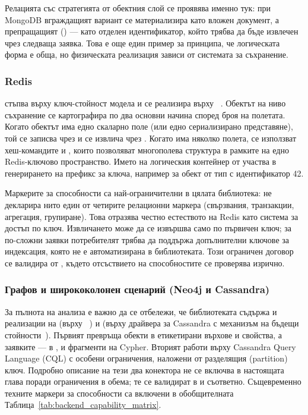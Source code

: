 Релацията със стратегията  от обектния слой се проявява именно тук: при MongoDB вграждащият вариант се материализира като вложен документ, а препращащият () --- като отделен идентификатор, който трябва да бъде извлечен чрез следваща заявка. Това е още един пример за принципа, че логическата форма е обща, но физическата реализация зависи от системата за съхранение.

\subsubsection{Redis}

 стъпва върху ключ-стойност модела и се реализира върху ~\cite{hiredis}. Обектът на ниво съхранение се картографира по два основни начина според броя на полетата. Когато обектът има едно скаларно поле (или едно сериализирано представяне), той се записва чрез  и се извлича чрез . Когато има няколко полета, се използват хеш-командите  и , които позволяват многополева структура в рамките на едно Redis-ключово пространство. Името на логическия контейнер от  участва в генерирането на префикс за ключа, например  за обект от тип  с идентификатор 42.

Маркерите за способности са най-ограничителни в цялата библиотека:  не декларира нито един от четирите релационни маркера (свързвания, транзакции, агрегация, групиране). Това отразява честно естеството на Redis като система за достъп по ключ. Извличането може да се извършва само по първичен ключ; за по-сложни заявки потребителят трябва да поддържа допълнителни ключове за индексация, която не е автоматизирана в библиотеката. Този ограничен договор се валидира от , където отсъствието на способностите се проверява изрично.

\subsubsection{Графов и ширококолонен сценарий (Neo4j и Cassandra)}

За пълнота на анализа е важно да се отбележи, че библиотеката съдържа и реализации на  (върху ~\cite{libneo4j_client}) и  (върху драйвера за Cassandra с механизъм на бъдещи стойности~\cite{cassandra_futures}). Първият превръща обекти в етикетирани върхове и свойства, а заявките --- в ,  и  фрагменти на Cypher. Вторият работи върху Cassandra Query Language (CQL) с особени ограничения, наложени от разделящия (partition) ключ. Подробно описание на тези два конектора не се включва в настоящата глава поради ограничения в обема; те се валидират в  и  съответно. Същевременно техните маркери за способности са включени в обобщителната Таблица~\ref{tab:backend_capability_matrix}.

